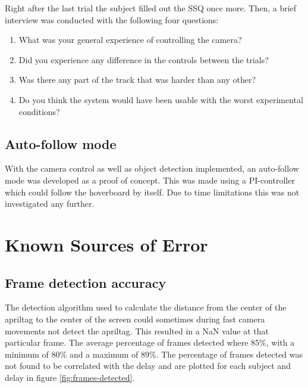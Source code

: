 \documentclass[nofilelist]{cslthse-msc}
\begin{document}
Right after the last trial the subject filled out the SSQ once more. Then, a brief interview was conducted with the following four questions:
\begin{enumerate}
   \item What was your general experience of controlling the camera?
   \item Did you experience any difference in the controls between the trials?
   \item Was there any part of the track that was harder than any other?
   \item Do you think the system would have been usable with the worst experimental conditions?
\end{enumerate}

\subsection{Auto-follow mode}
With the camera control as well as object detection implemented, an auto-follow mode was developed as a proof of concept. This was made using a PI-controller which could follow the hoverboard by itself. Due to time limitations this was not investigated any further.

\section{Known Sources of Error}

\subsection{Frame detection accuracy}
The detection algorithm used to calculate the distance from the center of the apriltag to the center of the screen could sometimes during fast camera movements not detect the apriltag. This resulted in a NaN value at that particular frame. The average percentage of frames detected where 85\%, with a minimum of 80\% and a maximum of 89\%. The percentage of frames detected was not found to be correlated with the delay and are plotted for each subject and delay in figure \ref{fig:frames-detected}. 
\end{document}
